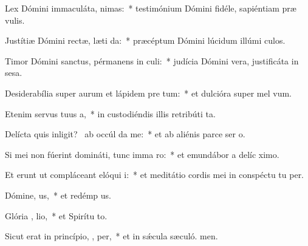 \item Lex Dómini immaculáta,  nimas:~* testimónium Dómini fidéle, sapiéntiam præ vulis.
\item Justítiæ Dómini rectæ, læti da:~* præcéptum Dómini lúcidum illúmi culos.
\item Timor Dómini sanctus, pérmanens in  culi:~* judícia Dómini vera, justificáta in sesa.
\item Desiderabília super aurum et lápidem pre tum:~* et dulcióra super mel  vum.
\item Etenim servus tuus  a,~* in custodiéndis illis retribúti ta.
\item Delícta quis inligit?~\pscross{} ab occúl  da me:~* et ab aliénis parce ser o.
\item Si mei non fúerint domináti, tunc imma ro:~* et emundábor a delíc ximo.
\item Et erunt ut compláceant elóqui  i:~* et meditátio cordis mei in conspéctu tu per.
\item Dómine,  us,~* et redémp us.
\item Glória ,  lio,~* et Spirítu to.
\item Sicut erat in princípio,  ,  per,~* et in sǽcula sæculó. men.
